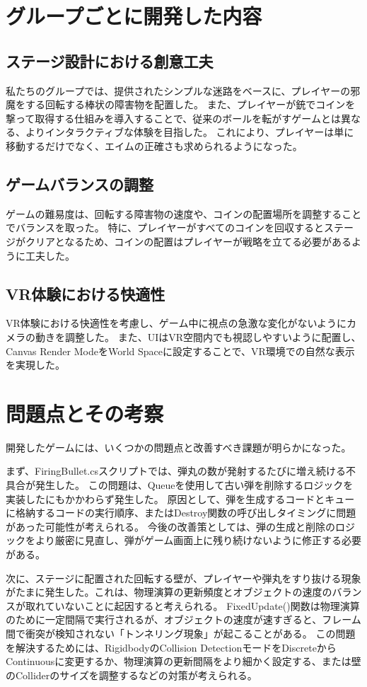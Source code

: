 \documentclass{jlreq}
\begin{document}
\section{グループごとに開発した内容}
\subsection{ステージ設計における創意工夫}
私たちのグループでは、提供されたシンプルな迷路をベースに、プレイヤーの邪魔をする回転する棒状の障害物を配置した。
また、プレイヤーが銃でコインを撃って取得する仕組みを導入することで、従来のボールを転がすゲームとは異なる、よりインタラクティブな体験を目指した。
これにより、プレイヤーは単に移動するだけでなく、エイムの正確さも求められるようになった。
\subsection{ゲームバランスの調整}
ゲームの難易度は、回転する障害物の速度や、コインの配置場所を調整することでバランスを取った。
特に、プレイヤーがすべてのコインを回収するとステージがクリアとなるため、コインの配置はプレイヤーが戦略を立てる必要があるように工夫した。
\subsection{VR体験における快適性}
VR体験における快適性を考慮し、ゲーム中に視点の急激な変化がないようにカメラの動きを調整した。
また、UIはVR空間内でも視認しやすいように配置し、Canvas Render ModeをWorld Spaceに設定することで、VR環境での自然な表示を実現した。

\section{問題点とその考察}
開発したゲームには、いくつかの問題点と改善すべき課題が明らかになった。

まず、FiringBullet.csスクリプトでは、弾丸の数が発射するたびに増え続ける不具合が発生した。
この問題は、Queueを使用して古い弾を削除するロジックを実装したにもかかわらず発生した。
原因として、弾を生成するコードとキューに格納するコードの実行順序、またはDestroy関数の呼び出しタイミングに問題があった可能性が考えられる。
今後の改善策としては、弾の生成と削除のロジックをより厳密に見直し、弾がゲーム画面上に残り続けないように修正する必要がある。

次に、ステージに配置された回転する壁が、プレイヤーや弾丸をすり抜ける現象がたまに発生した。これは、物理演算の更新頻度とオブジェクトの速度のバランスが取れていないことに起因すると考えられる。
FixedUpdate()関数は物理演算のために一定間隔で実行されるが、オブジェクトの速度が速すぎると、フレーム間で衝突が検知されない「トンネリング現象」が起こることがある。
この問題を解決するためには、RigidbodyのCollision DetectionモードをDiscreteからContinuousに変更するか、物理演算の更新間隔をより細かく設定する、または壁のColliderのサイズを調整するなどの対策が考えられる。
\end{document}

